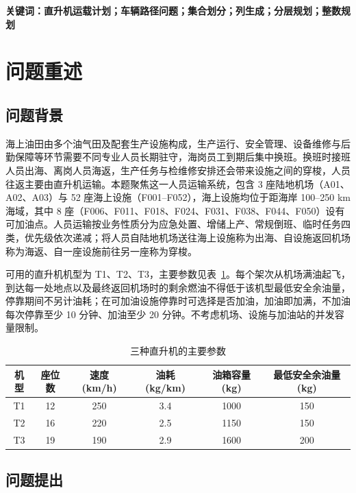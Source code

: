 \documentclass[UTF8,zihao=-4]{ctexart}
\numberwithin{figure}{section}
\numberwithin{table}{section}
\begin{document}
\vspace{1em}
\noindent\textbf{关键词：}\textbf{直升机运载计划；车辆路径问题；集合划分；列生成；分层规划；整数规划}

\newpage

\section{问题重述}

\subsection{问题背景}

海上油田由多个油气田及配套生产设施构成，生产运行、安全管理、设备维修与后勤保障等环节需要不同专业人员长期驻守，海岗员工到期后集中换班。换班时接班人员出海、离岗人员海返，生产任务与检维修安排还会带来设施之间的穿梭，人员往返主要由直升机运输。本题聚焦这一人员运输系统，包含 3 座陆地机场（A01、A02、A03）与 52 座海上设施（F001--F052），海上设施均位于距海岸 100--250 km 海域，其中 8 座（F006、F011、F018、F024、F031、F038、F044、F050）设有可加油点。人员运输按业务性质分为应急处置、增储上产、常规倒班、临时任务四类，优先级依次递减；将人员自陆地机场送往海上设施称为出海、自设施返回机场称为海返、自一座设施前往另一座称为穿梭。

可用的直升机机型为 T1、T2、T3，主要参数见表~\ref{tab:aircraft}。每个架次从机场满油起飞，到达每一处地点以及最终返回机场时的剩余燃油不得低于该机型最低安全余油量，停靠期间不另计油耗；在可加油设施停靠时可选择是否加油，加油即加满，不加油每次停靠至少 10 分钟、加油至少 20 分钟。不考虑机场、设施与加油站的并发容量限制。

\begin{table}[H]
  \centering
  \caption{三种直升机的主要参数}
  \label{tab:aircraft}
  \begin{tabular}{cccccc}
    \toprule
    机型 & 座位数 & 速度 (km/h) & 油耗 (kg/km) & 油箱容量 (kg) & 最低安全余油量 (kg) \\
    \midrule
    T1 & 12 & 250 & 3.4 & 1000 & 150 \\
    T2 & 16 & 220 & 2.5 & 1150 & 150 \\
    T3 & 19 & 190 & 2.9 & 1600 & 200 \\
    \bottomrule
  \end{tabular}
\end{table}

\subsection{问题提出}
\end{document}
